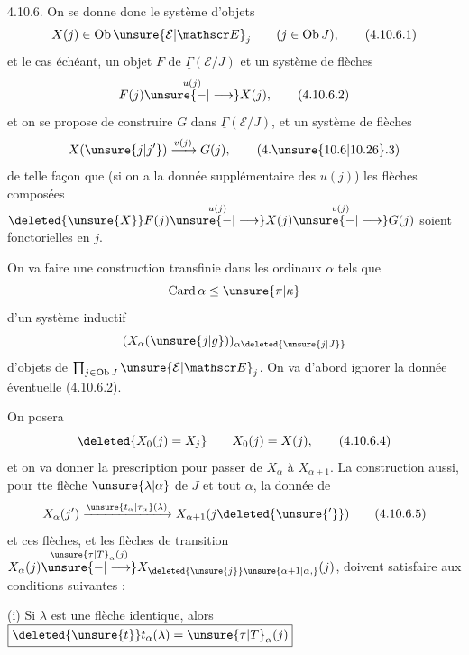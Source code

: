 4.10.6. On se donne donc le système d'objets
\[
 X(j)\in\operatorname{Ob}\unsure{\mathcal E|\mathscr E}_j\qquad (j\in\operatorname{Ob}J), \tag*{(4.10.6.1)}
\]
et le cas échéant, un objet $F$ de $\underline{\Gamma}(\mathcal E/J)$ et un système de flèches
\[
 F(j)\overset{u(j)}{\unsure{\mathbin{-}|\longrightarrow}}X(j), \tag*{(4.10.6.2)}
\]
et on se propose de construire $G$ dans $\underline{\Gamma}(\mathcal E/J)$, et un système de flèches
\[
 X(\unsure{j|j'})\xrightarrow{v(j)}G(j), \tag*{(4.\unsure{10.6|10.26}.3)}
\]
de telle façon que (si on a la donnée supplémentaire des $u(j)$) les flèches composées $\deleted{\unsure{X}}F(j)\overset{u(j)}{\unsure{\mathbin{-}|\longrightarrow}}X(j)\overset{v(j)}{\unsure{\mathbin{-}|\longrightarrow}}G(j)$
soient fonctorielles en $j$.

On va faire une construction transfinie dans les ordinaux $\alpha$ tels que
\[
 \operatorname{Card}\alpha\leq\unsure{\pi|\kappa}
\]
d'un système inductif
\[
 (X_{\alpha}(\unsure{j|g}))_{\alpha\deleted{\unsure{j|J}}}
\]
d'objets de $\prod_{j\in\operatorname{Ob}J}\unsure{\mathcal E|\mathscr E}_j$. On va d'abord ignorer la donnée éventuelle (4.10.6.2).

On posera
\[
 \deleted{X_0(j)=X_j}\qquad X_0(j)=X(j), \tag*{(4.10.6.4)}
\]
et on va donner la prescription pour passer de $X_{\alpha}$ à $X_{\alpha+1}$. La construction   aussi, pour tte flèche $\unsure{\lambda|\alpha}$  de $J$ et tout $\alpha$, la donnée de
\[
 X_{\alpha}(j')\xrightarrow{\unsure{t_{\alpha}|\tau_{\alpha}}(\lambda)}X_{\alpha+1}(j\deleted{\unsure{'}}) \tag*{(4.10.6.5)}
\]
et ces flèches, et les flèches de transition $X_{\alpha}(j)\overset{\unsure{\tau|T}_{\alpha}(j)}{\unsure{\mathbin{-}|\longrightarrow}} X_{\deleted{\unsure{j}}\unsure{\alpha+1|\alpha,}}(j)$, doivent
satisfaire aux  conditions suivantes :

\noindent\llap{\smash{\raisebox{-0.8\baselineskip}{$\Biggl\{$}}\quad}(i) Si $\lambda$ est une flèche identique,  alors $\boxed{\deleted{\unsure{t}}t_\alpha(\lambda)=\unsure{\tau|T}_\alpha(j)}$

